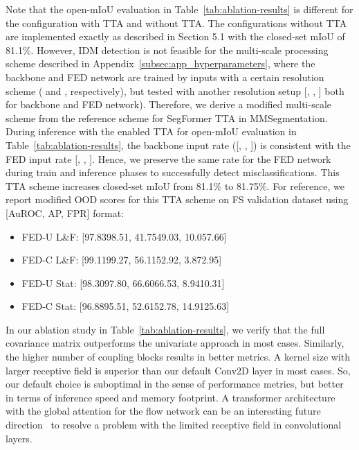 \documentclass[accepted, startpage]{uai2023}
\begin{document}
Note that the open-mIoU evaluation in Table~\ref{tab:ablation-results} is different for the configuration with TTA and without TTA. The configurations without TTA are implemented exactly as described in Section 5.1 with the closed-set mIoU of 81.1\%. However, IDM detection is not feasible for the multi-scale processing scheme described in Appendix~\ref{subsec:app_hyperparameters}, where the backbone and FED network are trained by inputs with a certain resolution scheme ( and , respectively), but tested with another resolution setup [, , ] both for backbone and FED network). Therefore, we derive a modified multi-scale scheme from the reference scheme for SegFormer TTA in MMSegmentation. During inference with the enabled TTA for open-mIoU evaluation in Table~\ref{tab:ablation-results}, the backbone input rate ([, , ]) is consistent with the FED input rate [, , ]. Hence, we preserve the same  rate for the FED network during train and inference phases to successfully detect misclassifications. This TTA scheme increases closed-set mIoU from 81.1\% to 81.75\%. For reference, we report modified OOD scores for this TTA scheme on FS validation dataset using [AuROC, AP, FPR] format:
\begin{itemize}
	\small
	\itemsep0em
	\item FED-U L\&F: [97.8398.51, 41.7549.03, 10.057.66]
	\item FED-C L\&F: [99.1199.27, 56.1152.92, 3.872.95]
	\item FED-U Stat: [98.3097.80, 66.6066.53, 8.9410.31]
	\item FED-C Stat: [96.8895.51, 52.6152.78, 14.9125.63]
\end{itemize}

In our ablation study in Table~\ref{tab:ablation-results}, we verify that the full covariance matrix  outperforms the univariate  approach in most cases. Similarly, the higher number of coupling blocks  results in better metrics. A  kernel size with larger receptive field is superior than our default  Conv2D layer in most cases. So, our default choice is suboptimal in the sense of performance metrics, but better in terms of inference speed and memory footprint. A transformer architecture with the global attention for the flow network can be an interesting future direction~\citep{Sukthanker_2022_CVPR} to resolve a problem with the limited receptive field in convolutional layers.
\end{document}
